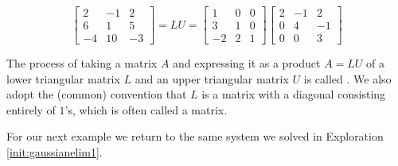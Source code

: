\documentclass{ximera}
\begin{document}
$$\begin{bmatrix}2&-1&2\\6&1&5\\-4&10&-3\end{bmatrix}=LU=\begin{bmatrix}1&0&0\\3&1&0\\-2&2&1\end{bmatrix}\begin{bmatrix}2&-1&2\\0&4&-1\\0&0&3\end{bmatrix}$$

The process of taking a matrix $A$ and expressing it as a product $A=LU$ of a lower triangular matrix $L$ and an upper triangular matrix $U$ is called .
We also adopt the (common) convention that $L$ is a matrix with a diagonal consisting entirely of $1$'s, which is often called a  matrix.

For our next example we return to the same system we solved in Exploration \ref{init:gaussianelim1}.
\end{document}
